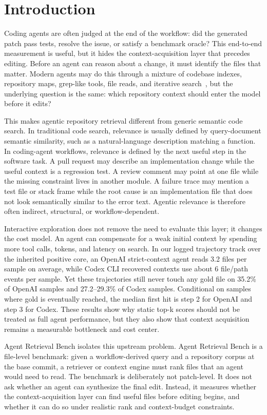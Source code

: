\documentclass[11pt]{article}
\newcommand{\arb}{Agent Retrieval Bench}
\begin{document}
\section{Introduction}

Coding agents are often judged at the end of the workflow: did the generated patch pass tests, resolve the issue, or satisfy a benchmark oracle? This end-to-end measurement is useful, but it hides the context-acquisition layer that precedes editing. Before an agent can reason about a change, it must identify the files that matter. Modern agents may do this through a mixture of codebase indexes, repository maps, grep-like tools, file reads, and iterative search~\citep{aiderrepomap,yang2024sweagent}, but the underlying question is the same: which repository context should enter the model before it edits?

This makes agentic repository retrieval different from generic semantic code search. In traditional code search, relevance is usually defined by query-document semantic similarity, such as a natural-language description matching a function. In coding-agent workflows, relevance is defined by the next useful step in the software task. A pull request may describe an implementation change while the useful context is a regression test. A review comment may point at one file while the missing constraint lives in another module. A failure trace may mention a test file or stack frame while the root cause is an implementation file that does not look semantically similar to the error text. Agentic relevance is therefore often indirect, structural, or workflow-dependent.

Interactive exploration does not remove the need to evaluate this layer; it changes the cost model. An agent can compensate for a weak initial context by spending more tool calls, tokens, and latency on search. In our logged trajectory track over the inherited positive core, an OpenAI strict-context agent reads 3.2 files per sample on average, while Codex CLI recovered contexts use about 6 file/path events per sample. Yet these trajectories still never touch any gold file on 35.2\% of OpenAI samples and 27.2--29.3\% of Codex samples. Conditional on samples where gold is eventually reached, the median first hit is step 2 for OpenAI and step 3 for Codex. These results show why static top-k scores should not be treated as full agent performance, but they also show that context acquisition remains a measurable bottleneck and cost center.

\arb{} isolates this upstream problem. \arb{} is a file-level benchmark: given a workflow-derived query and a repository corpus at the base commit, a retriever or context engine must rank files that an agent would need to read. The benchmark is deliberately not patch-level. It does not ask whether an agent can synthesize the final edit. Instead, it measures whether the context-acquisition layer can find useful files before editing begins, and whether it can do so under realistic rank and context-budget constraints.
\end{document}
